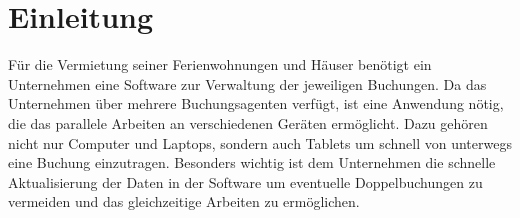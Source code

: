 \chapter{Einleitung}
Für die Vermietung seiner Ferienwohnungen und Häuser benötigt ein Unternehmen eine Software zur Verwaltung der jeweiligen Buchungen.
Da das Unternehmen über mehrere Buchungsagenten verfügt, ist eine Anwendung nötig, die das parallele Arbeiten an verschiedenen Geräten ermöglicht.
Dazu gehören nicht nur Computer und Laptops, sondern auch Tablets um schnell von unterwegs eine Buchung einzutragen.
Besonders wichtig ist dem Unternehmen die schnelle Aktualisierung der Daten in der Software um eventuelle Doppelbuchungen zu vermeiden und das gleichzeitige Arbeiten zu ermöglichen.